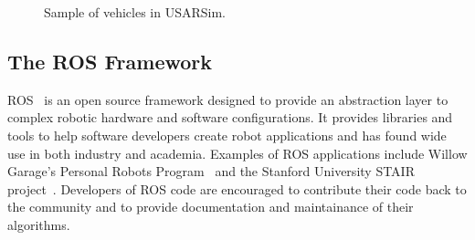 \begin{figure}[t!]
\centering
{}\qquad
{}\qquad
{}\qquad
{}
\caption{Sample of vehicles in USARSim.}
\end{figure}

\subsection*{The ROS Framework}

ROS~\cite{ROSWeb} is an open source framework designed to provide an abstraction layer to complex robotic hardware and software configurations. It provides libraries and tools to help software developers create robot applications and has found wide use in both industry and academia. Examples of ROS applications include
Willow Garage's Personal Robots Program~\cite{WYOBEK.ICRA.2008} and the Stanford University STAIR project~\cite{QUIGLEY.AAAI.2007}. Developers of ROS code are encouraged to
contribute their code back to the community and to provide documentation and maintainance of their algorithms.

